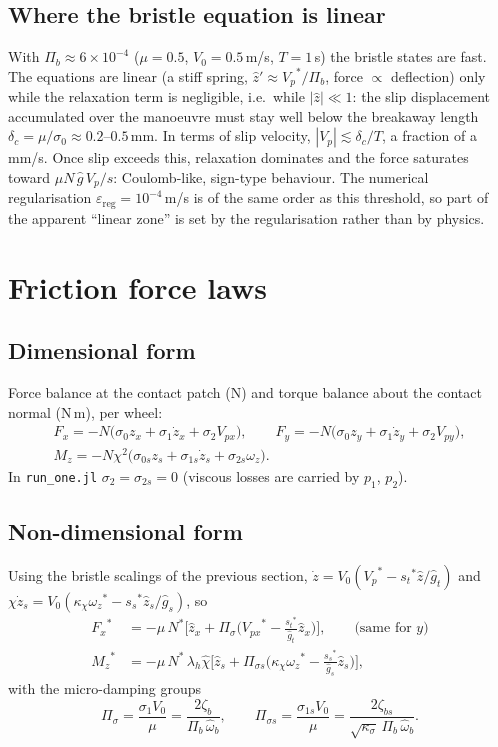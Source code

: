 \documentclass[11pt]{article}
\newcommand{\st}[1]{{#1}^{*}}
\begin{document}
\subsection{Where the bristle equation is linear}
With $\Pi_b \approx 6\times10^{-4}$ ($\mu = 0.5$, $V_0 = 0.5$\,m/s, $T = 1$\,s)
the bristle states are fast. The equations are linear (a stiff spring,
$\hat z' \approx \st{V_p}/\Pi_b$, force $\propto$ deflection) only while the
relaxation term is negligible, i.e.\ while $|\hat z| \ll 1$: the slip
displacement accumulated over the manoeuvre must stay well below the breakaway
length $\delta_c = \mu/\sigma_0 \approx 0.2$--$0.5$\,mm. In terms of slip
velocity, $|V_p| \lesssim \delta_c/T$, a fraction of a mm/s. Once slip exceeds
this, relaxation dominates and the force saturates toward
$\mu N\,\hat g\,V_p/s$: Coulomb-like, sign-type behaviour. The numerical
regularisation $\varepsilon_{\mathrm{reg}} = 10^{-4}$\,m/s is of the same order
as this threshold, so part of the apparent ``linear zone'' is set by the
regularisation rather than by physics.

\section{Friction force laws}

\subsection{Dimensional form}
Force balance at the contact patch (N) and torque balance about the contact
normal (N\,m), per wheel:
\begin{gather}
F_{x} = -N\big(\sigma_0 z_x + \sigma_1\dot z_x + \sigma_2 V_{px}\big),\qquad
F_{y} = -N\big(\sigma_0 z_y + \sigma_1\dot z_y + \sigma_2 V_{py}\big),\\
M_z = -N\chi^2\big(\sigma_{0s}z_s + \sigma_{1s}\dot z_s + \sigma_{2s}\omega_z\big).
\end{gather}
In \texttt{run\_one.jl} $\sigma_2 = \sigma_{2s} = 0$ (viscous losses are carried by
$p_1$, $p_2$).

\subsection{Non-dimensional form}
Using the bristle scalings of the previous section,
$\dot z = V_0(\st{V_p} - \st{s_t}\hat z/\hat g_t)$ and
$\chi\dot z_s = V_0(\kappa_\chi\st{\omega_z} - \st{s_s}\hat z_s/\hat g_s)$, so
\begin{align}
\st{F_{x}} &= -\mu\,\st{N}\Big[\hat z_x
  + \Pi_{\sigma}\big(\st{V_{px}} - \tfrac{\st{s_t}}{\hat g_t}\hat z_x\big)\Big],
  \qquad \text{(same for $y$)}\\
\st{M_z} &= -\mu\,\st{N}\,\lambda_h\hat\chi\Big[\hat z_s
  + \Pi_{\sigma s}\big(\kappa_\chi\st{\omega_z} - \tfrac{\st{s_s}}{\hat g_s}\hat z_s\big)\Big],
\end{align}
with the micro-damping groups
\begin{equation}
\Pi_\sigma = \frac{\sigma_1 V_0}{\mu} = \frac{2\zeta_b}{\Pi_b\,\hat\omega_b},
\qquad
\Pi_{\sigma s} = \frac{\sigma_{1s} V_0}{\mu}
 = \frac{2\zeta_{bs}}{\sqrt{\kappa_\sigma}\,\Pi_b\,\hat\omega_b}.
\end{equation}
\end{document}
